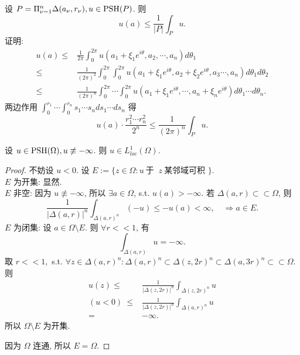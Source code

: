 \begin{remark}
  设 $P=\Pi_{\nu =1}^{n} \Delta (a_{\nu },r_{\nu }), u \in \operatorname{PSH} (P)$.  
  则 
  $$ u(a) \leq \frac{1}{|P|} \int_{P}u. $$
  证明: 
  $$ \begin{aligned}
    u(a) \leq & \frac{1}{2 \pi } \int_{0}^{2 \pi }u(a_1+ \xi _1 e^{i \theta },a_2,\cdots , a_{n}) d \theta _1\\
    \leq & \frac{1}{(2 \pi)^2 } \int_{0}^{2 \pi }\int_{0}^{2 \pi }u(a_1+ \xi _1 e^{i \theta },a_2+\xi _2 e^{i \theta }, a_3 \cdots , a_{n}) d \theta _1 d \theta _2\\
    \leq & \frac{1}{(2 \pi)^n } \int_{0}^{2 \pi } \cdots \int_{0}^{2 \pi } u(a_1+ \xi _1 e^{i \theta },\cdots , a_{n}+\xi _n e^{ i \theta }) d \theta _1 \cdots d \theta _n.
  \end{aligned}  $$
  两边作用 $\int_{0}^{r_1} \cdots \int_{0}^{r_n}s_1 \cdots s_n ds_1 \cdots ds_{n}$ 得  
  $$ u(a) \cdot  \frac{r_{1}^{2} \cdots r_{n}^{2}}{2^n}  \leq \frac{1}{(2 \pi )^n} \int_{P}u.$$ 
\end{remark}

\begin{proposition}
  设 $u \in \operatorname{PSH} (\Omega ), u\not \equiv - \infty $. 则 $u \in L_{loc}^{1}(\Omega )$.  
\end{proposition}
\begin{proof}
  不妨设 $u <0$. 
  设 $E:=\{z \in \Omega : u ~\text{于 }~ z ~\text{某邻域可积 }\}$. \\
  $E$ 为开集: 显然. \\
  $E$ 非空:   因为 $u \not \equiv - \infty $, 所以 $\exists a \in \Omega $, s.t. $u(a)>-\infty $. 若 $\Delta (a,r) \subset \subset \Omega $, 则 
  $$ \frac{1}{|\Delta (a,r)|^n}\int_{\Delta (a,r)^n}(-u) \leq -u(a) < \infty , \quad \Rightarrow a \in E .$$    
  $E$ 为闭集: 设 $a \in \Omega \setminus E$. 则 $\forall r <<1$, 有 
  $$ \int_{\Delta (a,r)} u =- \infty . $$  
 取  $r << 1,$ s.t. $\forall z \in \Delta (a,r)^n:\Delta (a,r)^n \subset \Delta (z,2r)^n \subset \Delta (a,3r)^n \subset \subset \Omega $. 则 
 $$ \begin{aligned}
  u(z) \leq & \frac{1}{| \Delta (z,2r) |^n } \int_{\Delta (z,2r)^n} u\\
  (u <0)~\leq & \frac{1}{| \Delta (z,2r) |^n } \int_{\Delta (a,r)^n} u \\
  =& -\infty .
 \end{aligned}  $$    
 所以 $\Omega \setminus E$ 为开集. 
 
 因为 $\Omega $ 连通, 所以 $E=\Omega $.  
\end{proof}


